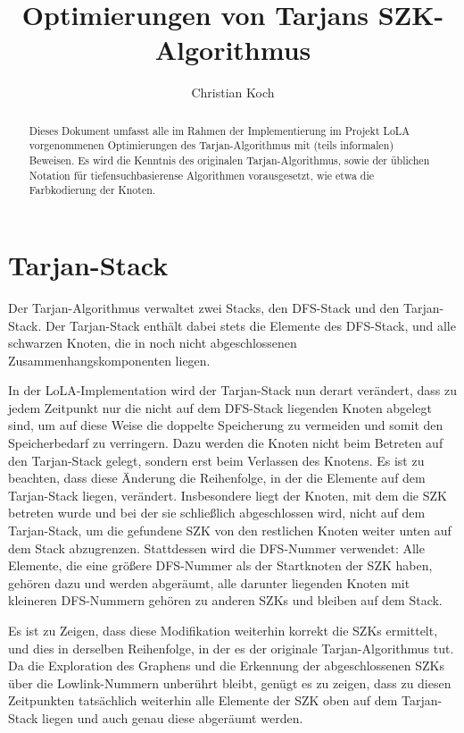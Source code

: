 \documentclass[a4paper]{llncs}
\title{Optimierungen von Tarjans SZK-Algorithmus}
\author{
Christian Koch
}
\institute{
Institut f\"ur Informatik, Universit\"at Rostock, D-18051 Rostock, Germany.\\
}
\begin{document}
\maketitle

\begin{abstract}
Dieses Dokument umfasst alle im Rahmen der Implementierung im Projekt LoLA vorgenommenen Optimierungen des Tarjan-Algorithmus mit (teils informalen) Beweisen. Es wird die Kenntnis des originalen Tarjan-Algorithmus, sowie der üblichen Notation für tiefensuchbasierense Algorithmen vorausgesetzt, wie etwa die Farbkodierung der Knoten.

\end{abstract}
%
%
%
%
%
\section{Tarjan-Stack}

Der Tarjan-Algorithmus verwaltet zwei Stacks, den DFS-Stack und den Tarjan-Stack.
Der Tarjan-Stack enthält dabei stets die Elemente des DFS-Stack, und alle schwarzen Knoten, die in noch nicht abgeschlossenen Zusammenhangskomponenten liegen.

In der LoLA-Implementation wird der Tarjan-Stack nun derart verändert, dass zu jedem Zeitpunkt nur die nicht auf dem DFS-Stack liegenden Knoten abgelegt sind, um auf diese Weise die doppelte Speicherung zu vermeiden und somit den Speicherbedarf zu verringern.
Dazu werden die Knoten nicht beim Betreten auf den Tarjan-Stack gelegt, sondern erst beim Verlassen des Knotens.
Es ist zu beachten, dass diese Änderung die Reihenfolge, in der die Elemente auf dem Tarjan-Stack liegen, verändert.
Insbesondere liegt der Knoten, mit dem die SZK betreten wurde und bei der sie schließlich abgeschlossen wird, nicht auf dem Tarjan-Stack, um die gefundene SZK von den restlichen Knoten weiter unten auf dem Stack abzugrenzen.
Stattdessen wird die DFS-Nummer verwendet: Alle Elemente, die eine größere DFS-Nummer als der Startknoten der SZK haben, gehören dazu und werden abgeräumt, alle darunter liegenden Knoten mit kleineren DFS-Nummern gehören zu anderen SZKs und bleiben auf dem Stack.

Es ist zu Zeigen, dass diese Modifikation weiterhin korrekt die SZKs ermittelt, und dies in derselben Reihenfolge, in der es der originale Tarjan-Algorithmus tut.
Da die Exploration des Graphens und die Erkennung der abgeschlossenen SZKs über die Lowlink-Nummern unberührt bleibt, genügt es zu zeigen, dass zu diesen Zeitpunkten tatsächlich weiterhin alle Elemente der SZK oben auf dem Tarjan-Stack liegen und auch genau diese abgeräumt werden.
\end{document}
